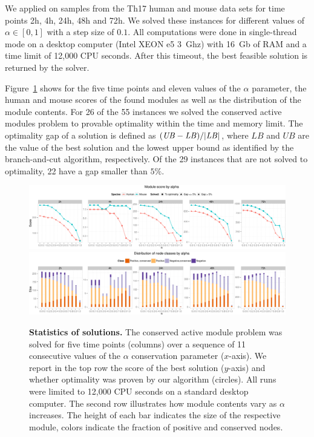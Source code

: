 			We applied \xheinz{} on samples from the Th17 human and mouse data sets for time points \unit{2}{h}, \unit{4}{h}, \unit{24}{h}, \unit{48}{h} and \unit{72}{h}.
			We solved these instances for different values of $\alpha \in [0, 1]$ with a step size of $0.1$.
			All computations were done in single-thread mode on a desktop computer (Intel XEON e5 3~Ghz) with 16~Gb of RAM and a time limit of 12,000 CPU seconds.
			After this timeout, the best feasible solution is returned by the solver.

			Figure~\ref{fig:scores} shows for the five time points and eleven values of the $\alpha$ parameter, the human and mouse scores of the found modules as well as the distribution of the module contents.
			For 26 of the 55 instances we solved the conserved active modules problem to provable optimality  within the time and memory limit.
			The optimality gap of a solution is defined as $(\mathit{UB} - \mathit{LB}) / \lvert\mathit{LB}\rvert$, where $\mathit{LB}$ and $\mathit{UB}$ are the value of the best solution and the lowest upper bound as identified by the branch-and-cut algorithm, respectively.
			Of the 29 instances that are not solved to optimality, 22 have a gap smaller than $5\%$.

\begin{figure}[btp]
  \centering
  \includegraphics[width=\linewidth,trim=0 0 0 10mm,clip]{img/score_by_alpha_array-crop.pdf}\\
  \includegraphics[width=\linewidth,trim=0 0 0 10mm,clip]{img/node_classes_by_alpha_array_scores-crop.pdf}
  \caption{\textbf{Statistics of \xheinz{} solutions.}
  	  The conserved active module problem was solved for five time points (columns) over a sequence of 11 consecutive values of the $\alpha$ conservation parameter ($x$-axis).
  	  We report in the top row the score of the best solution ($y$-axis) and whether optimality was proven by our algorithm (circles).
  All runs were limited to 12,000 CPU seconds on a standard desktop computer.
  The second row illustrates how module contents vary as $\alpha$ increases.
  The height of each bar indicates the size of the respective module, colors indicate the fraction of positive and conserved nodes.
  \label{fig:scores}}
\end{figure}


